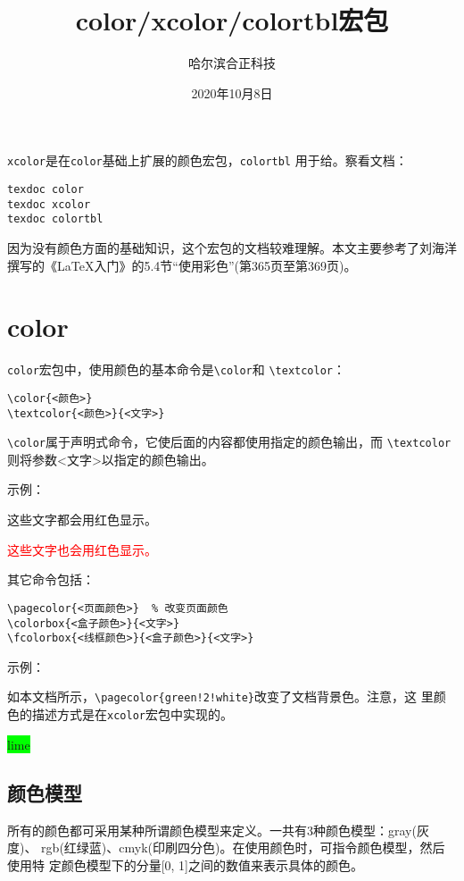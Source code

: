 \documentclass{article}
\title{color/xcolor/colortbl宏包}
\author{哈尔滨合正科技}
\date{2020年10月8日}
\begin{document}
\maketitle

\pagecolor{green!1!white}

\texttt{xcolor}是在\texttt{color}基础上扩展的颜色宏包，\texttt{colortbl}
用于给。察看文档：

\begin{verbatim}
texdoc color
texdoc xcolor
texdoc colortbl
\end{verbatim}

因为没有颜色方面的基础知识，这个宏包的文档较难理解。本文主要参考了刘海洋
撰写的《\LaTeX{}入门》的5.4节“使用彩色”(第365页至第369页)。

\section{color}

\texttt{color}宏包中，使用颜色的基本命令是\verb!\color!和
\verb!\textcolor!：

\begin{verbatim}
\color{<颜色>}
\textcolor{<颜色>}{<文字>}
\end{verbatim}

\verb!\color!属于声明式命令，它使后面的内容都使用指定的颜色输出，而
\verb!\textcolor!则将参数<文字>以指定的颜色输出。

示例：

{\color{red} 这些文字都会用红色显示。}

\textcolor{red}{这些文字也会用红色显示。}

其它命令包括：

\begin{verbatim}
\pagecolor{<页面颜色>}  % 改变页面颜色
\colorbox{<盒子颜色>}{<文字>} 
\fcolorbox{<线框颜色>}{<盒子颜色>}{<文字>}
\end{verbatim}

示例：

如本文档所示，\verb|\pagecolor{green!2!white}|改变了文档背景色。注意，这
里颜色的描述方式是在\texttt{xcolor}宏包中实现的。

\colorbox{lime}{lime}


\subsection{颜色模型}

所有的颜色都可采用某种所谓颜色模型来定义。一共有3种颜色模型：gray(灰度)、
rgb(红绿蓝)、cmyk(印刷四分色)。在使用颜色时，可指令颜色模型，然后使用特
定颜色模型下的分量[0, 1]之间的数值来表示具体的颜色。
\end{document}
